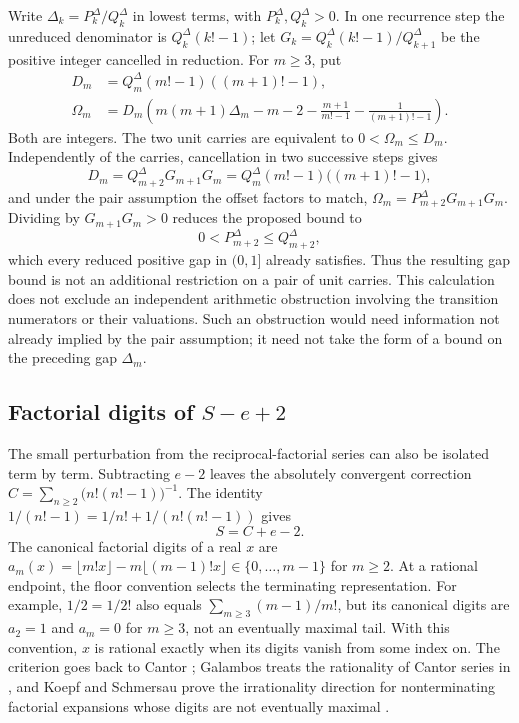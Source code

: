 \documentclass[11pt]{article}
\newcommand{\Ser}{S}
\begin{document}
Write $\Delta_k=P^\Delta_k/Q^\Delta_k$ in lowest terms, with $P^\Delta_k,Q^\Delta_k>0$.
In one recurrence step the unreduced denominator is $Q^\Delta_k(k!-1)$;
let $G_k=Q^\Delta_k(k!-1)/Q^\Delta_{k+1}$ be the positive integer cancelled in reduction.
For $m\ge3$, put
\[
 \begin{aligned}
 D_m&=Q^\Delta_m(m!-1)((m+1)!-1),\\
 \Omega_m&=D_m\left(m(m+1)\Delta_m-m-2
       -\frac{m+1}{m!-1}-\frac1{(m+1)!-1}\right).
 \end{aligned}
\]
Both are integers. The two unit carries are equivalent to
$0<\Omega_m\le D_m$. Independently of the carries, cancellation in two
successive steps gives
\[
 D_m=Q^\Delta_{m+2}G_{m+1}G_m=Q^\Delta_m(m!-1)\bigl((m+1)!-1\bigr),
\]
and under the pair assumption the offset factors to match,
$\Omega_m=P^\Delta_{m+2}G_{m+1}G_m$.  Dividing by $G_{m+1}G_m>0$ reduces the proposed bound to
\[
 0<P^\Delta_{m+2}\le Q^\Delta_{m+2},
\]
which every reduced positive gap in $(0,1]$ already satisfies.  Thus the resulting gap bound is not an additional restriction on a
pair of unit carries. This calculation does not exclude an independent
arithmetic obstruction involving the transition numerators or their
valuations. Such an obstruction would need information not already
implied by the pair assumption; it need not take the form of a bound on
the preceding gap $\Delta_m$.

\subsection{Factorial digits of \texorpdfstring{$S-e+2$}{S-e+2}}\label{long68:sec:companion-digits}

The small perturbation from the reciprocal-factorial series can also
be isolated term by term. Subtracting $e-2$ leaves the absolutely
convergent correction $C=\sum_{n\ge2}\bigl(n!(n!-1)\bigr)^{-1}$.
The identity $1/(n!-1)=1/n!+1/(n!(n!-1))$ gives
\begin{equation}\label{long68:eq:companion-decomposition}
 \Ser=C+e-2 .
\end{equation}
The canonical factorial digits of a real $x$ are
$a_m(x)=\lfloor m!x\rfloor-m\lfloor(m-1)!x\rfloor\in\{0,\ldots,m-1\}$
for $m\ge2$. At a rational endpoint, the floor convention selects the
terminating representation. For example, $1/2=1/2!$ also equals
$\sum_{m\ge3}(m-1)/m!$, but its canonical digits are $a_2=1$ and
$a_m=0$ for $m\ge3$, not an eventually maximal tail. With this convention,
$x$ is rational exactly when its digits vanish from some index on. The criterion
goes back to Cantor \cite{cantor1869}; Galambos treats the rationality of
Cantor series in \cite[Ch.~II, \S2.1, pp.~21--22]{galambos1976}, and Koepf
and Schmersau prove the irrationality direction for nonterminating factorial
expansions whose digits are not eventually maximal
\cite[Example~3.2, p.~121]{koepf-schmersau}.
\end{document}
